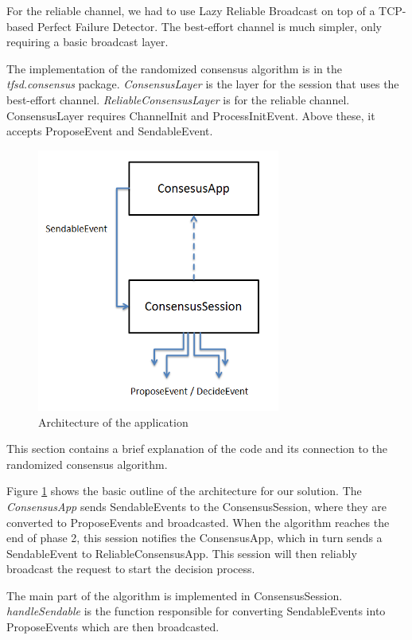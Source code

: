 \documentclass[times, 12pt,twocolumn]{article}
\begin{document}
For the reliable channel, we had to use Lazy Reliable Broadcast on top
of a TCP-based Perfect Failure Detector. The best-effort channel is much simpler, 
only requiring a basic broadcast layer.

The implementation of the randomized consensus algorithm is in the 
\textit{tfsd.consensus} package. \textit{ConsensusLayer} is the layer for the 
session that uses the best-effort channel. \textit{ReliableConsensusLayer} is for 
the reliable channel. ConsensusLayer requires ChannelInit and ProcessInitEvent. 
Above these, it accepts ProposeEvent and SendableEvent.


\begin{figure}[ht!]
\centering
\includegraphics[width=80mm]{arch.png}
\caption{Architecture of the application}
\label{fig:arch}
\end{figure}

This section contains a brief explanation of the code and its connection 
to the randomized consensus algorithm.
 
Figure \ref{fig:arch} shows the basic outline of the architecture for our 
solution. The \textit{ConsensusApp} sends SendableEvents to the ConsensusSession, 
where they are converted to ProposeEvents and broadcasted. When the algorithm 
reaches the end of phase 2, this session notifies the ConsensusApp, which in turn 
sends a SendableEvent to ReliableConsensusApp. This session will then reliably 
broadcast the request to start the decision process.

The main part of the algorithm is implemented in ConsensusSession. 
\textit{handleSendable} is the function responsible for converting SendableEvents 
into ProposeEvents which are then broadcasted.
\end{document}
